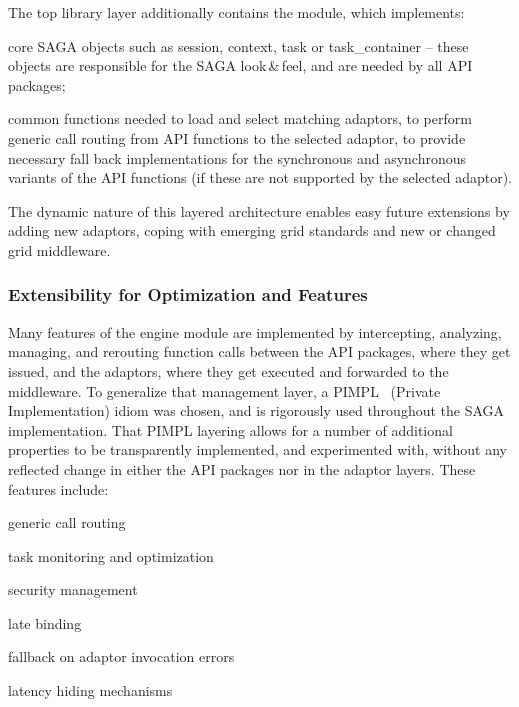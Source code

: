 	The top library layer additionally contains the  module,
  which implements:
	\begin{shortlist}
		\item core SAGA objects such as session, context, task or 
					task\_container -- these objects are responsible for the
          SAGA look\,\&\,feel, and are needed by all API packages;
		\item common functions needed to load and select matching 
					adaptors, to perform generic call routing from API 
					functions to the selected adaptor, to provide necessary
					fall back implementations for the synchronous and asynchronous
					variants of the API functions (if these are not supported by
          the selected adaptor).
	\end{shortlist}

	The dynamic nature of this layered architecture enables easy future 
	extensions by adding new adaptors, coping with emerging grid standards 
	and new or changed grid middleware.
	

\subsubsection{Extensibility for Optimization and Features} 

  Many features of the engine module are implemented by intercepting,
  analyzing, managing, and rerouting function calls between the API packages,
  where they get issued, and the adaptors, where they get executed
  and forwarded to the middleware.  To generalize that management
  layer, a PIMPL~\cite{pimpl} (Private Implementation) 
  idiom was chosen, and is rigorously
  used throughout the SAGA implementation.  That PIMPL layering allows
  for a number of additional properties to be transparently
  implemented, and experimen\-ted with, without any reflected change in
  either the API packages nor in the adaptor layers.  These features
  include:

	\begin{shortlist}
    \item generic call routing
	  \item task monitoring and optimization
    \item security management
    \item late binding
	  \item fallback on adaptor invocation errors
    \item latency hiding mechanisms
	\end{shortlist}

